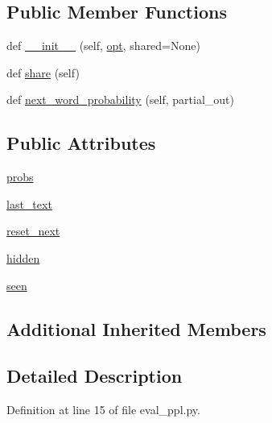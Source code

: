 \subsection*{Public Member Functions}
\begin{DoxyCompactItemize}
\item 
def \hyperlink{classeval__ppl_1_1LanguageModelEntry_afaa98a6a3b889e3bb42476f922ad0c85}{\+\_\+\+\_\+init\+\_\+\+\_\+} (self, \hyperlink{classparlai_1_1agents_1_1language__model_1_1language__model_1_1LanguageModelAgent_af8d8114af65bf817afe01545033d51e6}{opt}, shared=None)
\item 
def \hyperlink{classeval__ppl_1_1LanguageModelEntry_afaf442afdbe4e60c6ba23ef124580833}{share} (self)
\item 
def \hyperlink{classeval__ppl_1_1LanguageModelEntry_af85d7318e4f445adc2a942190dc68081}{next\+\_\+word\+\_\+probability} (self, partial\+\_\+out)
\end{DoxyCompactItemize}
\subsection*{Public Attributes}
\begin{DoxyCompactItemize}
\item 
\hyperlink{classeval__ppl_1_1LanguageModelEntry_a74ba7064b448984bf665064434c65d14}{probs}
\item 
\hyperlink{classeval__ppl_1_1LanguageModelEntry_a87e4936bda2064ad015d67d19cad7b97}{last\+\_\+text}
\item 
\hyperlink{classeval__ppl_1_1LanguageModelEntry_aab90db3556ebfed7f31ab9d560e033f5}{reset\+\_\+next}
\item 
\hyperlink{classeval__ppl_1_1LanguageModelEntry_a0c227eedb0c0436603b7fb7e6e99fd95}{hidden}
\item 
\hyperlink{classeval__ppl_1_1LanguageModelEntry_adbd6dba726e3a9f80630a2d2ccc9dc68}{seen}
\end{DoxyCompactItemize}
\subsection*{Additional Inherited Members}


\subsection{Detailed Description}


Definition at line 15 of file eval\+\_\+ppl.\+py.



